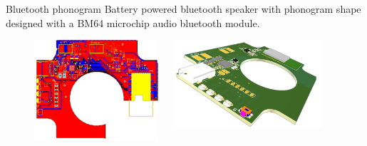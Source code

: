 \documentclass[aspectratio=169]{beamer}
\begin{document}
\begin{frame}{Bluetooth phonogram}
  Battery powered bluetooth speaker with phonogram shape designed with a BM64
  microchip audio bluetooth module.
  \begin{figure}[H]
    \centering
    \begin{columns}[T]
      \begin{column}{.3\linewidth}
        \includegraphics[width=\linewidth]{images/BluetoothPhonogram1}
      \end{column}
      \begin{column}{.3\linewidth}
        \includegraphics[width=\linewidth]{images/BluetoothPhonogram2}
      \end{column}
      \begin{column}{.3\linewidth}

\end{column}
\end{columns}
\end{figure}
\end{frame}
\end{document}
